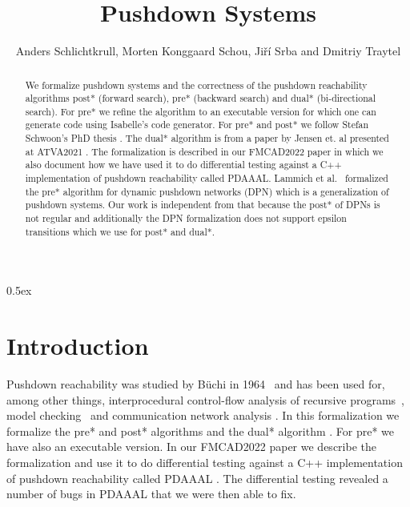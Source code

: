 \documentclass[10pt,a4paper]{article}
\begin{document}
\title{Pushdown Systems}
\author{Anders Schlichtkrull, Morten Konggaard Schou, Ji\v{r}\'i Srba and Dmitriy Traytel}
\date{}

\maketitle

\begin{abstract}
\noindent
We formalize pushdown systems and the correctness of the pushdown reachability algorithms post* (forward search), pre* (backward search) and dual* (bi-directional search).
For pre* we refine the algorithm to an executable version for which one can generate code using Isabelle's code generator.
For pre* and post* we follow Stefan Schwoon's PhD thesis \cite{schwoon2002model}. The dual* algorithm is from a paper by Jensen et. al presented at ATVA2021 \cite{DBLP:conf/atva/JensenSSSVD21}.
The formalization is described in our FMCAD2022 paper \cite{DBLP:conf/fmcad/SchlichtkrullSST22} in which we also document how we have used it to do differential
testing against a C++ implementation of pushdown reachability called PDAAAL.
Lammich et al.\ \cite{Lammich-DPN,DBLP:conf/cav/LammichMW09} formalized the pre* algorithm for
dynamic pushdown networks (DPN) which is a generalization of pushdown systems. 
Our work is independent from that because the post* of DPNs is not regular and 
additionally the DPN formalization does not support epsilon transitions which we use for post* and dual*.


\end{abstract}

\tableofcontents

\newpage

\parindent 0pt
\parskip 0.5ex

\section{Introduction}
Pushdown reachability was studied by B{\"u}chi in 1964~\cite{buchi1964regular} and has been used for, among other things, 
interprocedural control-flow analysis of recursive programs~\cite{esparza1999automata,conway2005incremental}, 
model checking~\cite{esparza2001bdd,moped,jmoped,bouajjani1997reachability} and communication network analysis \cite{JKMSST:coNEXT:18,jensen2020aalwines,DJJKMSST:TON:21}.
In this formalization we formalize the pre* and post* algorithms \cite{schwoon2002model} and the dual* algorithm \cite{DBLP:conf/atva/JensenSSSVD21}. For pre* we have also an executable version.
In our FMCAD2022 paper \cite{DBLP:conf/fmcad/SchlichtkrullSST22} we describe the formalization and use it to
do differential testing against a C++ implementation of pushdown reachability called PDAAAL \cite{DBLP:conf/atva/JensenSSSVD21}.
The differential testing revealed a number of bugs in PDAAAL that we were then able to fix.
\end{document}

